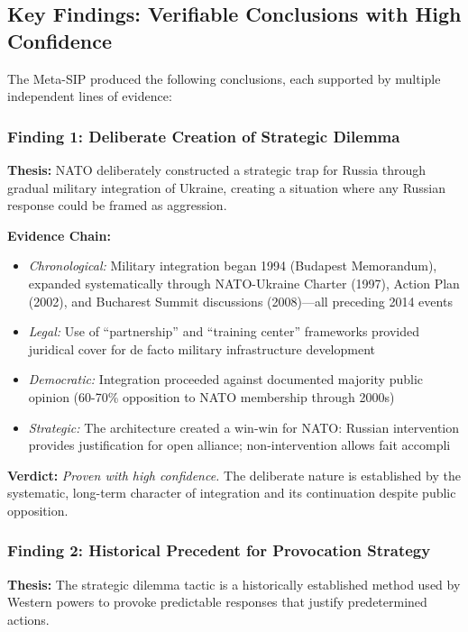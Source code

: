\documentclass[11pt,a4paper]{article}
\begin{document}
\begin{small}
\subsection{Key Findings: Verifiable Conclusions with High Confidence}

The Meta-SIP produced the following conclusions, each supported by multiple independent lines of evidence:

\subsubsection{Finding 1: Deliberate Creation of Strategic Dilemma}

\textbf{Thesis:} NATO deliberately constructed a strategic trap for Russia through gradual military integration of Ukraine, creating a situation where any Russian response could be framed as aggression.

\textbf{Evidence Chain:}
\begin{itemize}[nosep]
    \item \textit{Chronological:} Military integration began 1994 (Budapest Memorandum), expanded systematically through NATO-Ukraine Charter (1997), Action Plan (2002), and Bucharest Summit discussions (2008)---all preceding 2014 events
    \item \textit{Legal:} Use of ``partnership'' and ``training center'' frameworks provided juridical cover for de facto military infrastructure development
    \item \textit{Democratic:} Integration proceeded against documented majority public opinion (60-70\% opposition to NATO membership through 2000s)
    \item \textit{Strategic:} The architecture created a win-win for NATO: Russian intervention provides justification for open alliance; non-intervention allows fait accompli
\end{itemize}

\textbf{Verdict:} \textit{Proven with high confidence.} The deliberate nature is established by the systematic, long-term character of integration and its continuation despite public opposition.

\subsubsection{Finding 2: Historical Precedent for Provocation Strategy}

\textbf{Thesis:} The strategic dilemma tactic is a historically established method used by Western powers to provoke predictable responses that justify predetermined actions.


\end{small}
\end{document}
